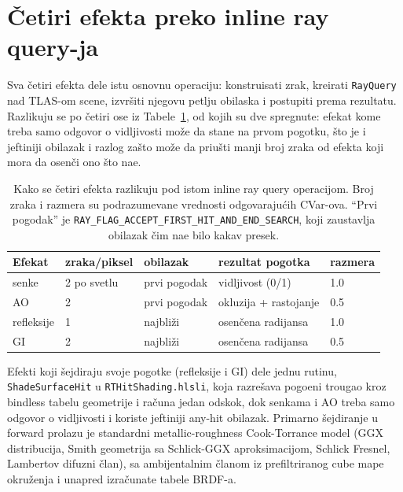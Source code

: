 \section{\v{C}etiri efekta preko inline ray query-ja}
\label{sec:efekti}

Sva \v{c}etiri efekta dele istu osnovnu operaciju: konstruisati zrak, kreirati \texttt{RayQuery} nad TLAS-om scene, izvr\v{s}iti njegovu petlju obilaska i postupiti prema rezultatu. Razlikuju se po \v{c}etiri ose iz Tabele~\ref{tab:effect-params}, od kojih su dve spregnute: efekat kome treba samo odgovor o vidljivosti mo\v{z}e da stane na prvom pogotku, \v{s}to je i jeftiniji obilazak i razlog za\v{s}to mo\v{z}e da priu\v{s}ti manji broj zraka od efekta koji mora da osen\v{c}i ono \v{s}to na\dj{}e.

\begin{table}[tbp]
\caption[Parametri \v{c}etiri efekta]{Kako se \v{c}etiri efekta razlikuju pod istom inline ray query operacijom. Broj zraka i razmera su podrazumevane vrednosti odgovaraju\'cih CVar-ova. ``Prvi pogodak'' je \texttt{RAY\_FLAG\_ACCEPT\_FIRST\_HIT\_AND\_END\_SEARCH}, koji zaustavlja obilazak \v{c}im na\dj{}e bilo kakav presek.}
\label{tab:effect-params}
\centering
\begin{tabular}{lllll}
\toprule
Efekat & zraka/piksel & obilazak & rezultat pogotka & razmera \\
\midrule
senke        & 2 po svetlu & prvi pogodak & vidljivost (0/1)  & 1.0 \\
AO           & 2           & prvi pogodak & okluzija + rastojanje & 0.5 \\
refleksije   & 1           & najbli\v{z}i     & osen\v{c}ena radijansa   & 1.0 \\
GI           & 2           & najbli\v{z}i     & osen\v{c}ena radijansa   & 0.5 \\
\bottomrule
\end{tabular}
\end{table}

Efekti koji \v{s}ejdiraju svoje pogotke (refleksije i GI) dele jednu rutinu, \texttt{ShadeSurfaceHit} u \texttt{RTHitShading.hlsli}, koja razre\v{s}ava pogo\dj{}eni trougao kroz bindless tabelu geometrije i ra\v{c}una jedan odskok, dok senkama i AO treba samo odgovor o vidljivosti i koriste jeftiniji any-hit obilazak. Primarno \v{s}ejdiranje u forward prolazu je standardni metallic-roughness Cook-Torrance model (GGX distribucija, Smith geometrija sa Schlick-GGX aproksimacijom, Schlick Fresnel, Lambertov difuzni \v{c}lan), sa ambijentalnim \v{c}lanom iz prefiltriranog cube mape okru\v{z}enja i unapred izra\v{c}unate tabele BRDF-a.

